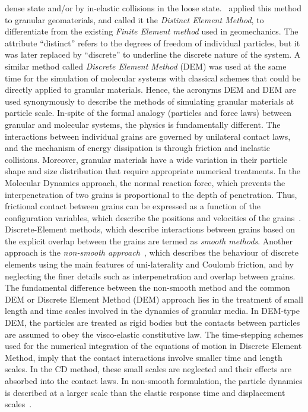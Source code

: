 dense state and/or by in-elastic collisions in the loose 
state.~\citet{Cundall1979} applied this 
method to granular geomaterials, and called it the \textit{Distinct Element 
Method}, to 
differentiate from the existing \textit{Finite Element method} used in 
geomechanics. The attribute 
``distinct'' refers to the degrees of freedom of individual particles, but it 
was later replaced 
by 
``discrete'' to underline the discrete nature of the system. A similar method 
called 
\textit{Discrete Element Method} (DEM) was used at the same time for the 
simulation of molecular 
systems 
with classical schemes that could be directly applied to granular materials. 
Hence, the acronyms 
DEM 
and DEM are used synonymously to describe the methods of simulating granular 
materials at particle 
scale. In-spite of the formal analogy (particles and force laws) between 
granular and molecular 
systems, the physics is fundamentally different. The interactions between 
individual grains are 
governed by unilateral contact laws, and the mechanism of energy dissipation is 
through friction 
and inelastic collisions. Moreover, granular materials have a wide variation in 
their particle 
shape and size distribution that require appropriate numerical treatments. In 
the Molecular 
Dynamics approach, the normal reaction force, which prevents the 
interpenetration of two grains is 
proportional to the depth of penetration. Thus, frictional contact between 
grains can be expressed 
as a function of the configuration variables, which describe the positions and 
velocities of the 
grains~\citep{Radjai2011}. Discrete-Element methods, which describe 
interactions between grains 
based on the explicit overlap between the grains are termed as \textit{smooth 
methods}. Another 
approach is the \textit{non-smooth approach}~\citep{Jean1999}, which describes 
the behaviour of 
discrete elements using the main features of uni-laterality and Coulomb 
friction, and by 
neglecting 
the finer details such as interpenetration and overlap between grains. The 
fundamental difference 
between the non-smooth method and the common DEM or Discrete Element Method 
(DEM) approach lies in 
the 
treatment of small length and time scales involved in the dynamics of granular 
media. In DEM-type 
DEM, the particles are treated as rigid bodies but the contacts between 
particles are assumed to 
obey the visco-elastic constitutive law. The time-stepping schemes used for the 
numerical 
integration of the equations of motion in Discrete Element Method, imply that 
the contact 
interactions 
involve smaller time and length scales. In the CD method, these small scales 
are neglected and 
their effects are absorbed into the contact laws. In non-smooth formulation, 
the particle dynamics 
is described at a larger scale than the elastic response time and displacement 
scales~\citep{Jean1999, Radjai2009}. 


